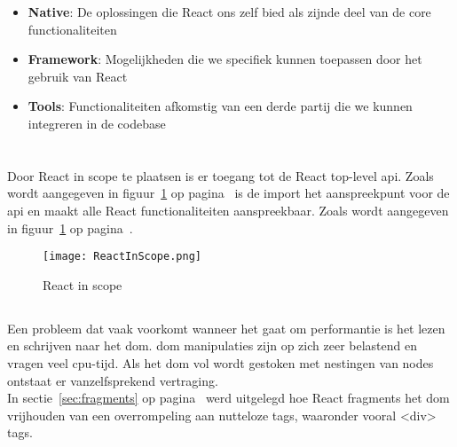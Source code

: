 \begin{itemize}[label={}]
    \item \textbf{Native}:
    De oplossingen die React ons zelf bied als zijnde deel van de core functionaliteiten \newline
    \item \textbf{Framework}:
    Mogelijkheden die we specifiek kunnen toepassen door het gebruik van React  \newline
    \item \textbf{Tools}:
    Functionaliteiten afkomstig van een derde partij die we kunnen integreren in de codebase
\end{itemize}

\section{}
\label{sec:nativeOplossingen}

Door React in scope te plaatsen is er toegang tot de React top-level \gls{api}. Zoals wordt aangegeven in figuur~\ref{fig:reactImport} op pagina~\pageref{fig:reactImport} is de import het aanspreekpunt voor de \gls{api} en maakt alle React functionaliteiten aanspreekbaar. Zoals wordt aangegeven in figuur~\ref{fig:reactImport} op pagina~\pageref{fig:reactImport}.

\begin{figure}[H]
    \texttt{[image: ReactInScope.png]}
    \caption{React in scope}
    \label{fig:reactImport}
\end{figure}

\subsection{}
\label{sec:fragmentsPraktisch}

Een probleem dat vaak voorkomt wanneer het gaat om performantie is het lezen en schrijven naar het \gls{dom}. \gls{dom} manipulaties zijn op zich zeer belastend en vragen veel \gls{cpu}-tijd. Als het \gls{dom} vol wordt gestoken met nestingen van nodes ontstaat er vanzelfsprekend vertraging.\\
In sectie~\ref{sec:fragments} op pagina~\pageref{sec:fragments} werd uitgelegd hoe React fragments het \gls{dom} vrijhouden van een overrompeling aan nutteloze tags, waaronder vooral <div> tags.

\subsection{}
\label{sec:pureComponent}

